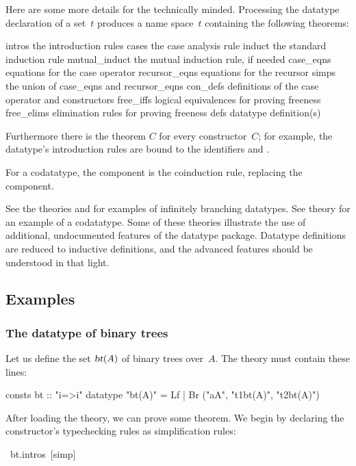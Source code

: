 Here are some more details for the technically minded.  Processing the
datatype declaration of a set~$t$ produces a name space~$t$ containing
the following theorems:
\begin{ttbox}\isastyleminor
intros          \textrm{the introduction rules}
cases           \textrm{the case analysis rule}
induct          \textrm{the standard induction rule}
mutual_induct   \textrm{the mutual induction rule, if needed}
case_eqns       \textrm{equations for the case operator}
recursor_eqns   \textrm{equations for the recursor}
simps           \textrm{the union of} case_eqns \textrm{and} recursor_eqns
con_defs        \textrm{definitions of the case operator and constructors}
free_iffs       \textrm{logical equivalences for proving freeness}
free_elims      \textrm{elimination rules for proving freeness}
defs            \textrm{datatype definition(s)}
\end{ttbox}
Furthermore there is the theorem $C$ for every constructor~$C$; for
example, the  datatype's introduction rules are bound to the
identifiers  and .

For a codatatype, the component  is the coinduction rule,
replacing the  component.

See the theories  and  for examples of
infinitely branching datatypes.  See theory  for an example
of a codatatype.  Some of these theories illustrate the use of additional,
undocumented features of the datatype package.  Datatype definitions are
reduced to inductive definitions, and the advanced features should be
understood in that light.


\subsection{Examples}

\subsubsection{The datatype of binary trees}

Let us define the set $\emph{\sl bt}(A)$ of binary trees over~$A$.  The theory
must contain these lines:
\begin{ttbox}\isastyleminor
consts   bt :: "i=>i"
datatype "bt(A)" = Lf | Br ("a\isasymin{}A", "t1\isasymin{}bt(A)", "t2\isasymin{}bt(A)")
\end{ttbox}
After loading the theory, we can prove some theorem.  
We begin by declaring the constructor's typechecking rules
as simplification rules:
\begin{isabelle}
\ bt.intros\ [simp]%
\end{isabelle}


